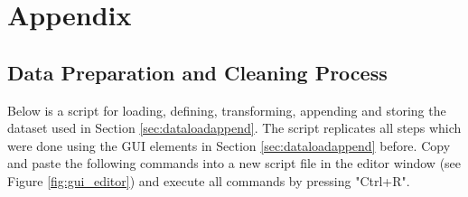 \documentclass[11pt]{article}
\newcommand{\remph}[1]{{\color{myred}#1}}
\begin{document}



\newpage

\appendix
\setcounter{table}{0}
\renewcommand{\thetable}{A\arabic{table}}
\setcounter{figure}{0}
\renewcommand{\thefigure}{A\arabic{figure}}

\section{Appendix}




\subsection{Data Preparation and Cleaning Process}
\label{sec:datapre}
Below is a script for loading, defining, transforming, appending and storing the dataset used in Section \ref{sec:dataloadappend}. The script replicates all steps which were done using the GUI elements in Section \ref{sec:dataloadappend} before. Copy and paste the following commands into a new script file in the editor window (see Figure \ref{fig:gui_editor}) and execute all commands by pressing "Ctrl+R".
\end{document}
